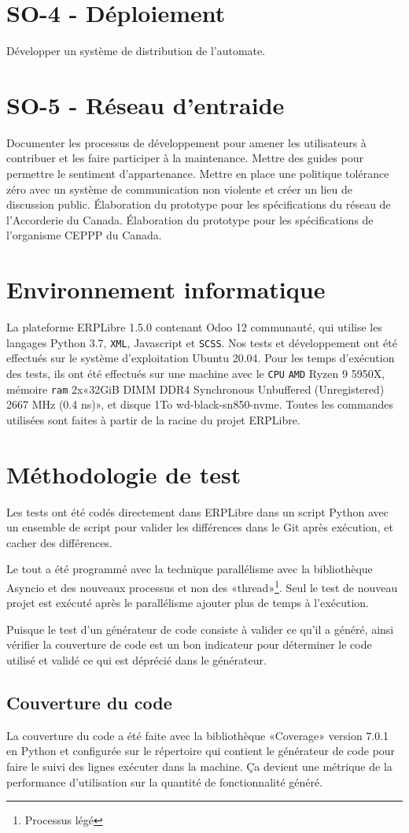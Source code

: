 \section{SO-4 - Déploiement}
Développer un système de distribution de l’automate.

\section{SO-5 - Réseau d’entraide}
Documenter les processus de développement pour amener les utilisateurs à contribuer et les faire participer à la maintenance. Mettre des guides pour permettre le sentiment d'appartenance. Mettre en place une politique tolérance zéro avec un système de communication non violente et créer un lieu de discussion public. Élaboration du prototype pour les spécifications du réseau de l’Accorderie du Canada. Élaboration du prototype pour les spécifications de l’organisme CEPPP du Canada.

\section{Environnement informatique}
La plateforme ERPLibre 1.5.0 contenant Odoo 12 communauté, qui utilise les langages Python 3.7, \texttt{XML}, Javascript et \texttt{SCSS}. Nos tests et développement ont été effectués sur le système d’exploitation Ubuntu 20.04.
Pour les temps d’exécution des tests, ils ont été effectués sur une machine avec le \texttt{CPU} \texttt{AMD} Ryzen 9 5950X, mémoire \texttt{ram} 2x«32GiB DIMM DDR4 Synchronous Unbuffered (Unregistered) 2667 MHz (0.4 ns)», et disque 1To wd-black-sn850-nvme.
Toutes les commandes utilisées sont faites à partir de la racine du projet ERPLibre.

\section{Méthodologie de test}
Les tests ont été codés directement dans ERPLibre dans un script Python avec un ensemble de script pour valider les différences dans le Git après exécution, et cacher des différences.

Le tout a été programmé avec la technique parallélisme avec la bibliothèque Asyncio et des nouveaux processus et non des «thread»\footnote{Processus légé}. Seul le test de nouveau projet est exécuté après le parallélisme ajouter plus de temps à l’exécution.

Puisque le test d’un générateur de code consiste à valider ce qu’il a généré, ainsi vérifier la couverture de code est un bon indicateur pour déterminer le code utilisé et validé ce qui est déprécié dans le générateur.

\subsection{Couverture du code}
La couverture du code a été faite avec la bibliothèque «Coverage» version 7.0.1 en Python et configurée sur le répertoire qui contient le générateur de code pour faire le suivi des lignes exécuter dans la machine. Ça devient une métrique de la performance d’utilisation sur la quantité de fonctionnalité généré.
